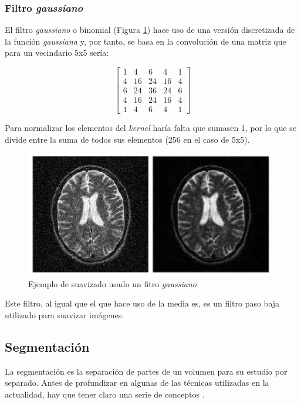 \subsubsection{Filtro \textit{gaussiano}}

El filtro \textit{gaussiano} o binomial (Figura \ref{fig:desarrollo/filtro-gaussiano}) hace uso de una versión discretizada de la función \textit{gaussiana} y, por tanto, se basa en la convolución de una matriz que para un vecindario 5x5 sería:

\[
\begin{bmatrix}
	1 & 4 & 6 & 4 & 1 \\
	4 & 16 & 24 & 16 & 4 \\
	6 & 24 & 36 & 24 & 6 \\
	4 & 16 & 24 & 16 & 4 \\
	1 & 4 & 6 & 4 & 1
\end{bmatrix} 
\]

Para normalizar los elementos del \textit{kernel} haría falta que sumasen 1, por lo que se divide entre la suma de todos sus elementos (256 en el caso de 5x5).

\begin{figure}[H]
	\centering
	\includegraphics[width=11cm]{imagenes/desarrollo/filtro-gaussiano}
	\caption{Ejemplo de suavizado usado un fitro \textit{gaussiano}}
	\label{fig:desarrollo/filtro-gaussiano}
\end{figure}

Este filtro, al igual que el que hace uso de la media es, es un filtro paso baja utilizado para suavizar imágenes.

\subsection{Segmentación}

La segmentación es la separación de partes de un volumen para su estudio por separado. Antes de profundizar en algunas de las técnicas utilizadas en la actualidad, hay que tener claro una serie de conceptos \cite{segmentation-concepts}.

